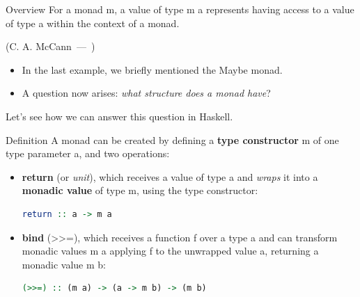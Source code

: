 \documentclass{beamer}
\let\oldquote\quote
\let\endoldquote\endquote
\renewenvironment{quote}[2][]
  {\if\relax\detokenize{#1}\relax
     \def\quoteauthor{#2}%
   \else
     \def\quoteauthor{#2~---~#1}%
   \fi
   \oldquote}
  {\par\nobreak\smallskip\hfill(\quoteauthor)%
   \endoldquote\addvspace{\bigskipamount}}
\begin{document}
\begin{frame}[fragile]{Overview}
    \begin{quote}{C. A. McCann}
        For a monad m, a value of type m a represents having access to a value of type a within the context of a monad.
    \end{quote}

    \begin{itemize}
        \item In the last example, we briefly mentioned the Maybe monad.
        \item A question now arises: \textit{what structure does a monad
        have}?
    \end{itemize}

    \bigbreak
    Let's see how we can answer this question in Haskell.
\end{frame}

\begin{frame}[fragile]{Definition}
    A monad can be created by defining a \textbf{type constructor} m of
    one type parameter a, and two operations:

    \bigbreak
    \begin{itemize}
        \item \textbf{return} (or \textit{unit}), which receives a value
        of type a and \textit{wraps} it into a \textbf{monadic value} of
        type m, using the type constructor:

        \begin{minipage}{\linewidth} \hspace{1cm}
        \begin{lstlisting}[language=haskell, numbers=none, frame=none]
          return :: a -> m a
        \end{lstlisting}
        \end{minipage} \hspace{1cm}

        \item \textbf{bind} (>>=), which receives a function f over a
        type a and can transform monadic values m a applying f to the
        unwrapped value a, returning a monadic value m b:

        \begin{minipage}{\linewidth} \hspace{1cm}
        \begin{lstlisting}[language=haskell, numbers=none, frame=none]
  (>>=) :: (m a) -> (a -> m b) -> (m b)
        \end{lstlisting}
        \end{minipage} \hspace{1cm}
    \end{itemize}
\end{frame}
\end{document}
